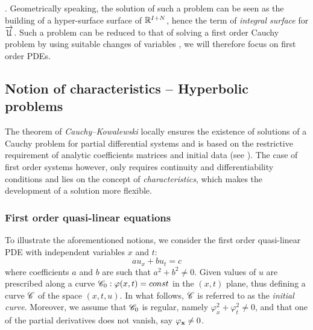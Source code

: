 . Geometrically speaking, the solution of such a problem can be seen as the building of a hyper-surface surface of $\mathbb{R}^{I+N}$, hence the term of \textit{integral surface} for ${\overrightarrow{\mathcal{U}}}$. Such a problem can be reduced to that of solving a first order Cauchy problem by using suitable changes of variables \cite[p.54]{PDEs}, we will therefore focus on first order PDEs.

\subsection{Notion of characteristics -- Hyperbolic problems}
The theorem of \textit{Cauchy--Kowalewski} locally ensures the existence of solutions of a Cauchy problem for partial differential systems and is based on the restrictive requirement of analytic coefficients matrices and initial data (see \cite[p.46]{PDEs}). The case of first order systems however, only requires continuity and differentiability conditions and lies on the concept of \textit{characteristics}, which makes the development of a solution more flexible.

\subsubsection*{First order quasi-linear equations}
To illustrate the aforementioned notions, we consider the first order quasi-linear PDE with independent variables $x$ and $t$:
\begin{equation}
  \label{eq:1st_order_pde}
   a u_x + b u_t  = c
\end{equation}
where coefficients $a$ and $b$ are such that $a^2 + b^2 \neq 0$. Given values of $u$ are prescribed along a curve $\mathscr{C}_0:\varphi(x,t)=const$ in the $(x,t)$ plane, thus defining a curve $\mathscr{C}$ of the space $(x,t,u)$. In what follows, $\mathscr{C}$ is referred to as the \textit{initial curve}.
Moreover, we assume that $\mathscr{C}_0$ is regular, namely $\varphi_x^2 + \varphi_t^2 \neq 0$, and that one of the partial derivatives does not vanish, say $\varphi_{\mathbf{x}} \neq 0$.

